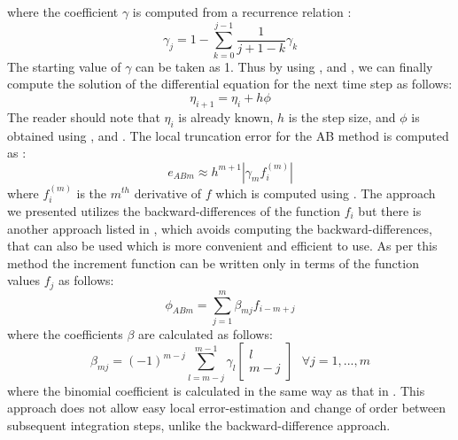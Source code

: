%
where the coefficient $\gamma$ is computed from a recurrence relation \cite{gillbook}:
\begin{equation}
\label{gamma_ab}
\gamma_j = 1 - \sum_{k=0}^{j-1} \frac{1}{j+1-k} \gamma_k
\end{equation}
%
The starting value of $\gamma$ can be taken as 1. Thus by using ,  and , we can finally compute the solution of the differential equation for the next time step as follows:
\begin{equation}
\label{ab_step}
\eta_{i+1} = \eta_i + h\phi
\end{equation}
%
The reader should note that $\eta_i$ is already known, $h$ is the step size, and $\phi$ is obtained using ,  and . The local truncation error for the \gls{AB} method is computed as \cite{gillbook}:
\begin{equation}
\label{eab}
e_{ABm} \approx h^{m+1} |\gamma_m f_i^{(m)}|
\end{equation}
%
where $f_i^{(m)}$ is the $m^{th}$ derivative of $f$ which is computed using . The approach we presented utilizes the backward-differences of the function $f_i$ but there is another approach listed in \cite{gillbook}, which avoids computing the backward-differences, that can also be used which is more convenient and efficient to use. As per this method the increment function can be written only in terms of the function values $f_j$ as follows:
\begin{equation}
\label{phi_ab_2}
\phi_{ABm} = \sum_{j=1}^m \beta_{mj} f_{i-m+j}
\end{equation}
%
where the coefficients $\beta$ are calculated as follows:
\begin{equation}
\label{beta_ab}
\beta_{mj} = (-1)^{m-j} \sum_{l=m-j}^{m-1} \gamma_l
\begin{bmatrix}
l\\
m-j
\end{bmatrix}
\text{  } \forall j=1,...,m
\end{equation}
%
where the binomial coefficient is calculated in the same way as that in . This approach does not allow easy local error-estimation and change of order between subsequent integration steps, unlike the backward-difference approach.

